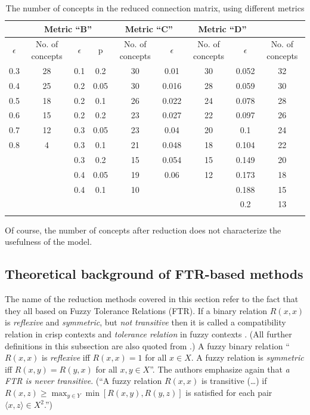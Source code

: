 \documentclass[graybox]{svmult}
\begin{document}
\begin{table}[!t]
\caption{The number of concepts in the reduced connection matrix, using different 
metrics \cite{hatwagnerm.f.koczyl.t.2015}}
\label{tab:reductionResults}
\centering
\begin{tabular}{ccccccccc}
\hline\noalign{\smallskip}
\multicolumn{2}{c}{Metric ``A''} &
  \multicolumn{3}{c}{Metric ``B''} &
  \multicolumn{2}{c}{Metric ``C''} &
  \multicolumn{2}{c}{Metric ``D''} \\
\hline\noalign{\smallskip}
$\epsilon$ & No. of concepts &
  $\epsilon$ & p & No. of concepts &
  $\epsilon$ & No. of concepts &
  $\epsilon$ & No. of concepts \\
\noalign{\smallskip}\svhline\noalign{\smallskip}
0.3 & 28 &
  0.1 & 0.2 & 30 &
  0.01 & 30 &
  0.052 & 32 \\
0.4 & 25 &
  0.2 & 0.05 & 30 &
  0.016 & 28 &
  0.059 & 30 \\
0.5 & 18 &
  0.2 & 0.1 & 26 &
  0.022 & 24 &
  0.078 & 28 \\
0.6 & 15 &
  0.2 & 0.2 & 23 &
  0.027 & 22 &
  0.097 & 26 \\
0.7 & 12 &
  0.3 & 0.05 & 23 &
  0.04 & 20 &
  0.1 & 24 \\
0.8 & 4 &
  0.3 & 0.1 & 21 &
  0.048 & 18 &
  0.104 & 22 \\
\multicolumn{2}{c}{} & 
  0.3 & 0.2 & 15 &
  0.054 & 15 &
  0.149 & 20 \\
\multicolumn{2}{c}{} & 
  0.4 & 0.05 & 19 &
  0.06 & 12 &
  0.173 & 18 \\
\multicolumn{2}{c}{} & 
  0.4 & 0.1 & 10 &
  \multicolumn{2}{c}{} &
  0.188 & 15 \\
\multicolumn{2}{c}{} &
  \multicolumn{3}{c}{} &
  \multicolumn{2}{c}{} &
  0.2 & 13 \\
\noalign{\smallskip}\hline\noalign{\smallskip}
\end{tabular}
\end{table}

Of course, the number of concepts after reduction does not characterize 
the usefulness of the model. 

\subsection{Theoretical background of FTR-based methods}

The name of the reduction methods covered in this section refer to the 
fact that they all based on Fuzzy Tolerance Relations (FTR). If a 
binary relation $R(x,x)$ is \emph{reflexive} and \emph{symmetric}, but 
\emph{not transitive} then it is called a compatibility relation in 
crisp contexts and \emph{tolerance relation} in fuzzy contexts 
\cite{klirg.j.yuanb.1995}. (All further definitions in this subsection 
are also quoted from \cite{klirg.j.yuanb.1995}.) A fuzzy binary 
relation ``$R(x,x)$ is \emph{reflexive} iff $R(x,x) = 1$ for all $x\in 
X$. A fuzzy relation is \emph{symmetric} iff $R(x,y)=R(y,x)$ for all 
$x,y\in X$''. The authors emphasize again that \emph{a FTR is never 
transitive}. (``A fuzzy relation $R(x,x)$ is transitive (\dots) if 
$R(x,z)\geq \max_{y\in Y}\min[R(x,y), R(y,z)]$ is satisfied for each 
pair $\langle x,z\rangle\in X^2$.'')
\end{document}
